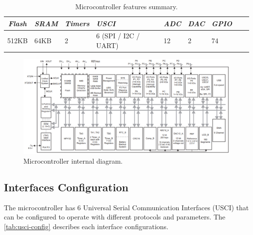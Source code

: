 \begin{table}[!h]
    \centering
    \begin{tabular}{cllllllll}
        \toprule[1.5pt]
        \textit{Flash} & \textit{SRAM} & \textit{Timers} & \textit{USCI} & \textit{ADC} & \textit{DAC} & \textit{GPIO} \\
        \midrule
        512KB  & 64KB  & 2  & 6 (SPI / I2C / UART)  & 12  & 2  & 74           \\
        \bottomrule[1.5pt]
    \end{tabular}
    \caption{Microcontroller features summary.}
    \label{tab:msp430-summary}
\end{table}

\begin{figure}[!ht]
    \begin{center}
        \includegraphics[width=\textwidth]{figures/msp430-diagram.png}
        \caption{Microcontroller internal diagram.}
        \label{fig:msp430-diagram}
    \end{center}
\end{figure}

\subsection{Interfaces Configuration}

The microcontroller has 6 Universal Serial Communication Interfaces (USCI) that can be configured to operate with different protocols and parameters. The \autoref{tab:usci-config} describes each interface configurations.

